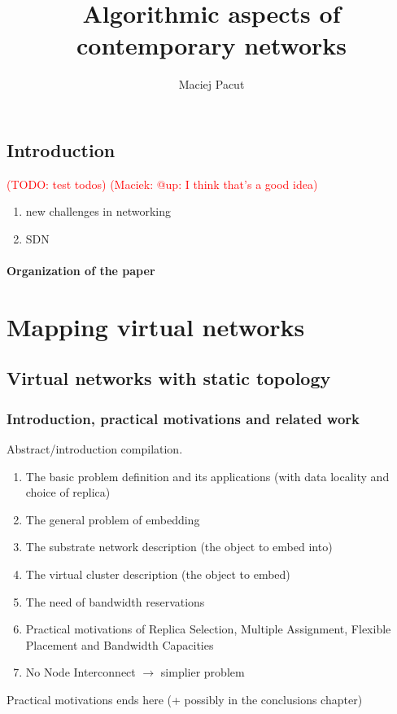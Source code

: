 \documentclass[a4paper]{book}
\title{Algorithmic aspects of contemporary networks}
\author{Maciej Pacut}
\newcommand{\margcomm}[1]{\marginpar{\footnotesize\raggedright #1}}
\newcommand{\todo}[1]{\noindent\textcolor{red}{(TODO: #1)}\margcomm{TODO}}
\newcommand{\maciek}[1]{\textcolor{red}{(Maciek: #1)}\margcomm{maciek}}
\begin{document}
\maketitle

\tableofcontents

  

\chapter{Introduction}
\todo{test todos}
\maciek{@up: I think that's a good idea}

\begin{enumerate}
  \item new challenges in networking \cite{tree-sparsity}
  \item SDN
\end{enumerate}

\subsection{Organization of the paper}

\part{Mapping virtual networks}

\chapter{Virtual networks with static topology}

\section{Introduction, practical motivations and related work}
Abstract/introduction compilation.
\begin{enumerate}
  \item The basic problem definition and its applications (with data locality and choice of replica)
  \item The general problem of embedding
  \item The substrate network description (the object to embed into)
  \item The virtual cluster description (the object to embed)
  \item The need of bandwidth reservations
  \item Practical motivations of Replica Selection, Multiple Assignment, Flexible Placement and Bandwidth Capacities
  \item No Node Interconnect $\rightarrow$ simplier problem
\end{enumerate}
Practical motivations ends here (+ possibly in the conclusions chapter)
\end{document}
